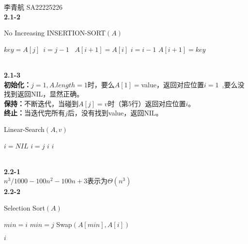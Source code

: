 \documentclass[UTF8]{ctexart}
\begin{document}
李青航 SA22225226\\
\textbf{2.1-2}\\
\begin{algorithm}
    \caption{No Increasing INSERTION-SORT$(A)$}
    \label{alg:1}
    \begin{algorithmic}[1]
            \STATE $key=A[j]$\
            \STATE $i=j-1$\
                \STATE$A[i+1]=A[i]$
                \STATE$i=i-1$
            \ENDWHILE
            \STATE $A[i+1]=key$
        \ENDFOR
        

    \end{algorithmic}
\end{algorithm}
\\
\textbf{2.1-3}\\
\textbf{初始化：}$j=1 ,A.length=1$时，要么$A[1]=$value，返回对应位置$i=1$\ ,要么没找到返回NIL，显然正确。\\
\textbf{保持：}不断迭代，当碰到$A[j]=v$时（第5行）返回对应位置$i$。\\
\textbf{终止：}当迭代完所有$j$后，没有找到value，返回NIL。\\
\begin{algorithm}
    \caption{  Linear-Search$(A,v)$}
    \label{alg:2}
    \begin{algorithmic}[1]
        \STATE$i=NIL$
               \STATE$i=j$
               \RETURN $i$
            \ENDIF
        \ENDFOR
        \RETURN $i$
    \end{algorithmic}
\end{algorithm}
\\
\textbf{2.2-1}\\
$n^3/1000-100n^2-100n+3$表示为$\Theta(n^3)$
\\
\textbf{2.2-2}\\
\begin{algorithm}
    \caption{Selection Sort$(A)$}
    \label{alg:3}
    \begin{algorithmic}[1]
            \STATE$min=i$
                    \STATE$min=j$
                \ENDIF
            \ENDFOR
            \STATE Swap$(A[min],A[i])$
        \ENDFOR
        
        \RETURN $i$
    \end{algorithmic}
\end{algorithm}
\\
\end{document}
